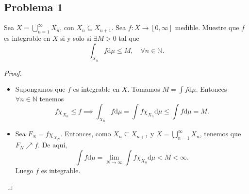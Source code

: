 \documentclass{article}
\theoremstyle{definition}
\theoremstyle{remark}
\numberwithin{equation}{section}
\newcommand{\N}{\mathbb{N}}
\renewcommand{\d}{\mathrm{d}}
\newcommand{\oo}{\infty}
\newcommand{\ds}{\displaystyle}
\begin{document}
\subsection{Problema 1}
Sea $\ds X = \bigcup_{n=1}^\oo X_n$, con $X_n \subseteq X_{n+1}$. Sea $f \colon X \to [0,\oo]$ medible. Muestre que $f$ es integrable en $X$ si y solo si $\exists M>0$ tal que 
\[ \int_{X_n} f \d\mu \leq M, \quad \forall n \in \N. \]

\begin{proof}
  \ \begin{itemize}
    \item \boxed{\implies} Supongamos que $f$ es integrable en $X$. Tomamos $\ds M = \int f \d\mu$. Entonces $\forall n \in \N$ tenemos
    \[ f\chi_{X_n} \leq f \implies \int_{X_n} f \d\mu = \int f\chi_{X_n} \d\mu \leq \int f \d\mu = M. \]
    \item \boxed{\impliedby} Sea $F_N = f \chi_{X_N}$. Entonces, como $X_n \subseteq X_{n+1}$ y $\ds X = \bigcup_{n=1}^\oo X_n$, tenemos que $F_N \nearrow f$. De aquí, 
    \[ \int f \d\mu = \lim_{N\to\oo} \int f \chi_{X_n} \d\mu < M < \oo. \]
    Luego $f$ es integrable.
  \end{itemize}
\end{proof}

\newpage
\end{document}
